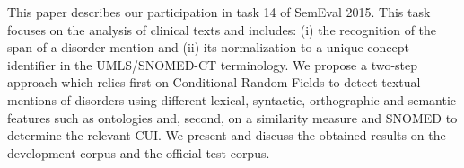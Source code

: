 This paper describes our participation in task 14 of SemEval 2015. This task focuses on the analysis of clinical texts and includes: (i) the recognition of the span of a disorder mention and (ii) its normalization to a unique concept identifier in the UMLS/SNOMED-CT terminology. We propose a two-step approach which relies first on Conditional Random Fields to detect textual mentions of disorders using different lexical, syntactic, orthographic and semantic features such as ontologies and, second, on a similarity measure and SNOMED to determine the relevant CUI. We present and discuss the obtained results on the development corpus and the official test corpus.
